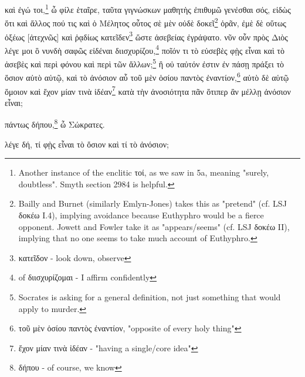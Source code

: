 καὶ
ἐγώ
τοι,\footnote{Αnother instance of the enclitic τοί, as we saw in 5a, meaning "surely, doubtless". Smyth section 2984 is helpful.}
ὦ
φίλε
ἑταῖρε,
ταῦτα
γιγνώσκων
μαθητὴς
ἐπιθυμῶ
γενέσθαι
σός,
εἰδὼς
ὅτι
καὶ
ἄλλος
πού
τις
καὶ
ὁ
Μέλητος
οὗτος
σὲ
μὲν
οὐδὲ
δοκεῖ\footnote{Bailly and Burnet (similarly Emlyn-Jones) takes this as "pretend" (cf. LSJ δοκέω I.4), implying avoidance because Euthyphro would be a fierce opponent. Jowett and Fowler take it as "appears/seems" (cf. LSJ δοκέω II), implying that no one seems to take much account of Euthyphro.}
ὁρᾶν,
ἐμὲ
δὲ
οὕτως
ὀξέως
[ἀτεχνῶς]
καὶ
ῥᾳδίως
κατεῖδεν\footnote{κατεῖδον - look down, observe}
ὥστε
ἀσεβείας
ἐγράψατο.
νῦν
οὖν
πρὸς
Διὸς
λέγε
μοι
ὃ
νυνδὴ
σαφῶς
εἰδέναι
διισχυρίζου,\footnote{ of διισχυρίζομαι - I affirm confidently}
ποῖόν
τι
τὸ
εὐσεβὲς
φῂς
εἶναι
καὶ
τὸ
ἀσεβὲς
\versification{[5d]}
καὶ
περὶ
φόνου
καὶ
περὶ
τῶν
ἄλλων;\footnote{Socrates is asking for a general definition, not just something that would apply to murder.}
ἢ
οὐ
ταὐτόν
ἐστιν
ἐν
πάσῃ
πράξει
τὸ
ὅσιον
αὐτὸ
αὑτῷ,
καὶ
τὸ
ἀνόσιον
αὖ
τοῦ
μὲν
ὁσίου
παντὸς
ἐναντίον,\footnote{τοῦ μὲν ὁσίου παντὸς ἐναντίον, "opposite of every holy thing"}
αὐτὸ
δὲ
αὑτῷ
ὅμοιον
καὶ
ἔχον
μίαν
τινὰ
ἰδέαν\footnote{ἔχον μίαν τινὰ ἰδέαν - "having a single/core idea"}
κατὰ
τὴν
ἀνοσιότητα
πᾶν
ὅτιπερ
ἂν
μέλλῃ
ἀνόσιον
εἶναι;

πάντως
δήπου,\footnote{δήπου - of course, we know}
ὦ
Σώκρατες.

λέγε
δή,
τί
φῂς
εἶναι
τὸ
ὅσιον
καὶ
τί
τὸ
ἀνόσιον;

